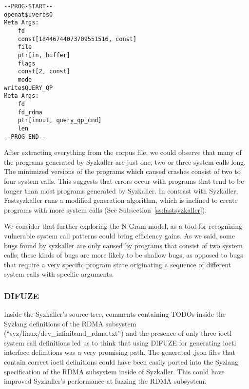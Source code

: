 \begin{lstlisting}[caption={Program generated by Syzkaller}, label={lst:syzprogram}, float, floatplacement=H]
--PROG-START--
openat$uverbs0
Meta Args:
	fd
	const[18446744073709551516, const]
	file
	ptr[in, buffer]
	flags
	const[2, const]
	mode
write$QUERY_QP
Meta Args:
	fd
	fd_rdma
	ptr[inout, query_qp_cmd]
	len
--PROG-END--
\end{lstlisting}


After extracting everything from the corpus file,
we could observe that many of the programs generated by Syzkaller are just one, two or three system calls long.
The minimized versions of the programs which caused crashes consist of two to four system calls. This suggests
that errors occur with programs that tend to be longer than most programs generated by Syzkaller.
In contrast with Syzkaller, Fastsyzkaller runs a modified generation algorithm, which is inclined to create programs
with more system calls (See Subsection~\ref{ss:fastsyzkaller}).

We consider that further exploring the N-Gram model, as a tool for recognizing vulnerable system call patterns could bring
efficiency gains. As we said, some bugs found by syzkaller are only caused by programs that consist of two system calls;
these kinds of bugs are more likely to be shallow bugs, as opposed to bugs that require a very specific program state
originating a sequence of different system calls with specific arguments.


\subsubsection{DIFUZE}\label{ss:disc-difuze}

Inside the Syzkaller's source tree, comments containing TODOs inside the Syzlang definitions of the RDMA subsystem (``syz/linux/dev\_infiniband\_rdma.txt'') and
the presence of only three ioctl system call definitions led us to think that using DIFUZE for generating ioctl interface definitions
was a very promising path. The generated .json files that contain correct ioctl definitions could have been easily ported into the
Syzlang specification of the RDMA subsystem inside of Syzkaller. This could have improved Syzkaller's performance at fuzzing
the RDMA subsystem.

